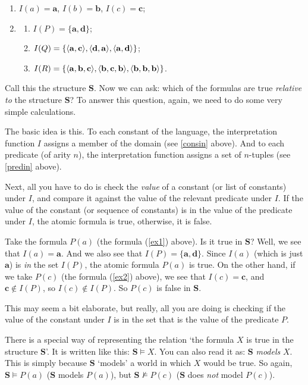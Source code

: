 \begin{enumerate}
	\item $I(a)=\mathbf{a}$, $I(b)=\mathbf{b}$, $I(c)=\mathbf{c}$; \label{consin}
	\item \label{predin}
		\begin{enumerate}
	\item $I(P)=\{\mathbf{a}, \mathbf{d}\}$;
	\item $I(Q)=\{\langle\mathbf{a}, \mathbf{c}\rangle, \langle\mathbf{d}, \mathbf{a}\rangle, \langle\mathbf{a}, \mathbf{d}\rangle\}$;
	\item $I(R)=\{\langle\mathbf{a}, \mathbf{b}, \mathbf{c}\rangle, \langle\mathbf{b}, \mathbf{c}, \mathbf{b}\rangle, \langle\mathbf{b}, \mathbf{b}, \mathbf{b}\rangle\}$.
		\end{enumerate} 
\end{enumerate}

Call this the structure $\mathbf{S}$. Now we can ask: which of the formulas are true \textit{relative to} the structure $\mathbf{S}$? To answer this question, again, we need to do some very simple calculations. 

The basic idea is this. To each constant of the language, the interpretation function $I$ assigns a member of the domain (see \ref{consin} above). And to each predicate (of arity $n$), the interpretation function assigns a set of $n$-tuples (see \ref{predin} above).

Next, all you have to do is check the \textit{value} of a constant (or list of constants) under $I$, and compare it against the value of the relevant predicate under $I$. If the value of the constant (or sequence of constants) is in the value of the predicate under $I$, the atomic formula is true, otherwise, it is false. 

Take the formula $P(a)$ (the formula (\ref{ex1}) above). Is it true in $\mathbf{S}$? Well, we see that $I(a)=\mathbf{a}$. And we also see that $I(P)=\{\mathbf{a}, \mathbf{d}\}$. Since $I(a)$ (which is just $\mathbf{a}$) is \textit{in} the set $I(P)$, the atomic formula $P(a)$ is true. On the other hand, if we take $P(c)$ (the formula (\ref{ex2}) above), we see that $I(c)=\mathbf{c}$, and $\mathbf{c} \notin I(P)$, so $I(c) \notin I(P)$. So $P(c)$ is false in $\mathbf{S}$. 

This may seem a bit elaborate, but really, all you are doing is checking if the value of the constant under $I$ is in the set that is the value of the predicate $P$. 

There is a special way of representing the relation `the formula $X$ is true in the structure $\mathbf{S}$'. It is written like this: $\mathbf{S} \models X$. You can also read it as: $\mathbf{S}$ \textit{models} $X$. This is simply because $\mathbf{S}$ `models' a world in which $X$ would be true. So again, $\mathbf{S}\models P(a)$ ($\mathbf{S}$ models $P(a)$), but $\mathbf{S}\not\models P(c)$ ($\mathbf{S}$ does \textit{not} model $P(c)$).

